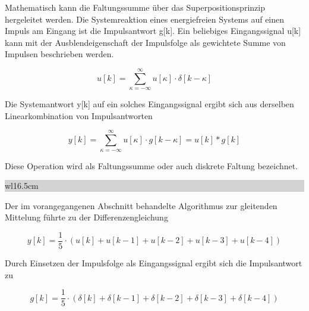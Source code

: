 \noindent Mathematisch kann die Faltungssumme \"{u}ber das Superpositionsprinzip hergeleitet werden. Die Systemreaktion eines energiefreien Systems auf einen Impuls am Eingang ist die Impulsantwort g[k]. Ein beliebiges Eingangssignal u[k] kann mit der Ausblendeigenschaft der Impulsfolge als gewichtete Summe von Impulsen beschrieben werden.

\begin{equation}\label{eq:foureightyfive}
u\left[k\right]=\sum _{\kappa =-\infty }^{\infty }u\left[\kappa \right]\cdot \delta \left[k-\kappa \right]
\end{equation}

\noindent Die Systemantwort y[k] auf ein solches Eingangssignal ergibt sich aus derselben Linearkombination von Impulsantworten

\begin{equation}\label{eq:foureightysix}
y\left[k\right]=\sum _{\kappa =-\infty }^{\infty }u\left[\kappa \right]\cdot g\left[k-\kappa \right] =u\left[k\right]*g\left[k\right]
\end{equation}

\noindent Diese Operation wird als Faltungssumme oder auch diskrete Faltung bezeichnet.\bigskip

\noindent
\colorbox{lightgray}{%
%
\renewcommand\arraystretch{0.6}%
\begin{tabular}{ wl{16.5cm} }
{}
\end{tabular}%
}\medskip

\noindent Der im vorangegangenen Abschnitt behandelte Algorithmus zur gleitenden Mittelung f\"{u}hrte zu der Differenzengleichung

\begin{equation}\label{eq:foureightyseven}
y\left[k\right]=\frac{1}{5} \cdot \left(u\left[k\right]+u\left[k-1\right]+u\left[k-2\right]+u\left[k-3\right]+u\left[k-4\right]\right)
\end{equation}

\noindent Durch Einsetzen der Impulsfolge als Eingangssignal ergibt sich die Impulsantwort zu

\begin{equation}\label{eq:foureightyeight}
g\left[k\right]=\frac{1}{5} \cdot \left(\delta \left[k\right]+\delta \left[k-1\right]+\delta \left[k-2\right]+\delta \left[k-3\right]+\delta \left[k-4\right]\right)
\end{equation}

